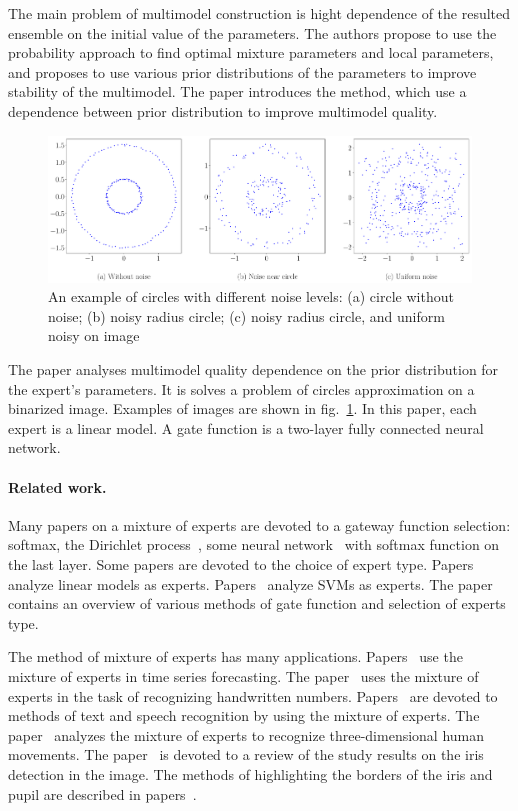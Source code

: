 \documentclass[12pt, twoside]{article}
\numberwithin{equation}{section}
\begin{document}
The main problem of multimodel construction is hight dependence of the resulted ensemble on the initial value of the parameters.
The authors propose to use the probability approach to find optimal mixture parameters and local parameters, and proposes to use various prior distributions of the parameters to improve stability of the multimodel.
The paper introduces the method, which use a dependence between prior distribution to improve multimodel quality.

\begin{figure}[h!t]\center
\includegraphics[width=1\textwidth]{result_eng/statment}
\caption{An example of circles with different noise levels: (a) circle without noise; (b) noisy radius circle; (c) noisy radius circle, and uniform noisy on image}
\label{example:1}
\end{figure}

The paper analyses multimodel quality dependence on the prior distribution for the expert's parameters.
It is solves a problem of circles approximation on a binarized image.
Examples of images are shown in fig.~\ref{example:1}.
In this paper, each expert is a linear model.
A gate function is a two-layer fully connected neural network.

\paragraph{Related work.}
Many papers on a mixture of experts are devoted to a gateway function selection: softmax, the Dirichlet process~\cite{Edward2002}, some neural network~\cite{Shazeer2017} with softmax function on the last layer.
Some papers are devoted to the choice of expert type. 
Papers~\cite{Jordan1994, Jordan1991} analyze linear models as experts.
Papers~\cite{Lima2007, Cao2003} analyze SVMs as experts.
The paper~\cite{Yuksel2012} contains an overview of various methods of gate function and selection of experts type.

The method of mixture of experts has many applications.
Papers~\cite{Yumlu2003, Cheung1995, Weigend2000} use the mixture of experts in time series forecasting.
The paper~\cite{Ebrahimpour2009} uses the mixture of experts in the task of recognizing handwritten numbers.
Papers~\cite{Estabrooks2001, Mossavat2010, Peng1996, Tuerk2001}  are devoted to methods of text and speech recognition by using the mixture of experts.
The paper~\cite{Sminchisescu2007} analyzes the mixture of experts to recognize three-dimensional human movements.
The paper~\cite{Bowyer2010} is devoted to a review of the study results on the iris detection in the image.
The methods of highlighting the borders of the iris and pupil are described in papers~\cite{Matveev2010, Matveev2014}.
\end{document}
